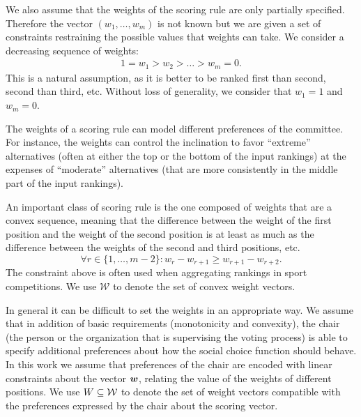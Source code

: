 \medskip
We also assume that the weights of the scoring rule are only partially specified.
Therefore the vector $(w_1,\ldots,w_m)$  is not known but we are given a set of constraints restraining the possible values that weights can take.
We consider a decreasing sequence of weights:
\begin{align}
1=w_{1} > w_{2} > \ldots > w_{m}=0. \label{eq:monotone}
\end{align}
This is a natural assumption, as it is better to be ranked first than second, second than third, etc. 
Without loss of generality, we consider that $w_1=1$ and $w_m=0$. 

The weights of a scoring rule can model different preferences of the committee. 
For instance, the weights can control the inclination to favor ``extreme'' alternatives (often at either the top or the bottom of the input rankings) at the expenses of ``moderate'' alternatives (that are more consistently in the middle part of the input rankings).

An important class of scoring rule is the one composed of weights that are a convex sequence, meaning that the difference between the weight of the first position and the weight of the second position is at least as much as the difference between the weights of the second and third positions, etc.
\begin{equation} 
\label{eq:convexity}
\forall r \in \{1,\ldots,m-2\}: w_r - w_{r+1} \geq w_{r+1}-w_{r+2}.
\end{equation}
The constraint above is often used when aggregating rankings in sport competitions.
We use $\mathcal{W}$ to denote the set of convex weight vectors.

In general it can be difficult to set the weights in an appropriate way.
We assume that in addition of basic requirements (monotonicity and convexity), the chair (the person or the organization that is supervising the voting process) is able to specify additional preferences about how the social choice function should behave.
In this work we assume that preferences of the chair are encoded with linear constraints about the vector $\bm{w}$, relating the value of the weights of different positions.
We use $W \subseteq \mathcal{W}$ to denote the set of weight vectors compatible with the preferences expressed by the chair about the scoring vector.

